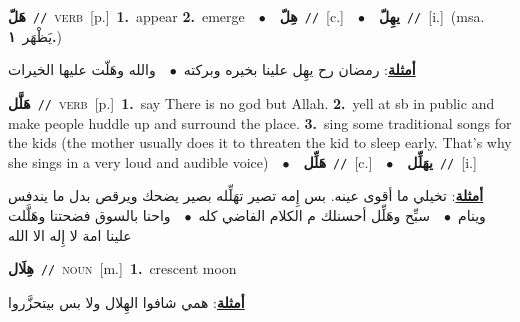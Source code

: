 \documentclass[10pt,a4paper,twoside]{article} %
\begin{document}
\begin{multicols}{2}
{\setlength\topsep{0pt}\textbf{\foreignlanguage{arabic}{هَلّ}}\ {\color{gray}\texttt{//}\color{black}}\ \textsc{verb}\ [p.]\ \textbf{1.}~appear  \textbf{2.}~emerge\ \ $\bullet$\ \ \setlength\topsep{0pt}\textbf{\foreignlanguage{arabic}{هِلّ}}\ {\color{gray}\texttt{//}\color{black}}\ [c.]\ \ $\bullet$\ \ \setlength\topsep{0pt}\textbf{\foreignlanguage{arabic}{يهِلّ}}\ {\color{gray}\texttt{//}\color{black}}\ [i.]\ \color{gray}(msa. \foreignlanguage{arabic}{يَظْهَر}~\foreignlanguage{arabic}{\textbf{١.}})\color{black}\  \begin{flushright}\color{gray}\foreignlanguage{arabic}{\textbf{\underline{\foreignlanguage{arabic}{أمثلة}}}: رمضان رح يهِل علينا بخيره وبركته\ $\bullet$\ \  والله وهَلّت عليها الخيرات}\end{flushright}\color{black}} \vspace{2mm}

{\setlength\topsep{0pt}\textbf{\foreignlanguage{arabic}{هَلَّل}}\ {\color{gray}\texttt{//}\color{black}}\ \textsc{verb}\ [p.]\ \textbf{1.}~say There is no god but Allah.  \textbf{2.}~yell at sb in public and make people huddle up and surround the place.  \textbf{3.}~sing some traditional songs for the kids (the mother usually does it to threaten the kid to sleep early. That's why she sings in a very loud and audible voice)\ \ $\bullet$\ \ \setlength\topsep{0pt}\textbf{\foreignlanguage{arabic}{هَلِّل}}\ {\color{gray}\texttt{//}\color{black}}\ [c.]\ \ $\bullet$\ \ \setlength\topsep{0pt}\textbf{\foreignlanguage{arabic}{يهَلِّل}}\ {\color{gray}\texttt{//}\color{black}}\ [i.]\  \begin{flushright}\color{gray}\foreignlanguage{arabic}{\textbf{\underline{\foreignlanguage{arabic}{أمثلة}}}: تخيلي ما أقوى عينه. بس إِمه تصير تهَلِّله بصير يضحك ويرقص بدل ما يندفس وينام\ $\bullet$\ \  سبِّح وهَلِّل أحسنلك م الكلام الفاضي كله\ $\bullet$\ \  واحنا بالسوق فضحتنا وهَلَّلت علينا امة لا إِله الا الله}\end{flushright}\color{black}} \vspace{2mm}

{\setlength\topsep{0pt}\textbf{\foreignlanguage{arabic}{هِلَال}}\ {\color{gray}\texttt{//}\color{black}}\ \textsc{noun}\ [m.]\ \textbf{1.}~crescent moon\  \begin{flushright}\color{gray}\foreignlanguage{arabic}{\textbf{\underline{\foreignlanguage{arabic}{أمثلة}}}: همي شافوا الهِلال ولا بس بيتحزَّروا}\end{flushright}\color{black}} \vspace{2mm}


\end{multicols}
\end{document}
